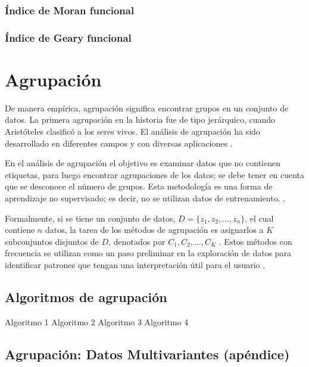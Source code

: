 \documentclass[
]{book}
\begin{document}
\hypertarget{uxedndice-de-moran-funcional}{%
\subsection{Índice de Moran funcional}\label{uxedndice-de-moran-funcional}}

\hypertarget{uxedndice-de-geary-funcional}{%
\subsection{Índice de Geary funcional}\label{uxedndice-de-geary-funcional}}

\hypertarget{agrupaciuxf3n}{%
\chapter{Agrupación}\label{agrupaciuxf3n}}

De manera empírica, agrupación significa encontrar grupos en un conjunto de datos. La primera agrupación en la historia fue de tipo jerárquico, cuando Aristóteles clasificó a los seres vivos. El análisis de agrupación ha sido desarrollado en diferentes campos y con diversas aplicaciones \citep{hand}.

En el análisis de agrupación el objetivo es examinar datos que no contienen etiquetas, para luego encontrar agrupaciones de los datos; se debe tener en cuenta que se desconoce el número de grupos. Esta metodología es una forma de aprendizaje no supervisado; es decir, no se utilizan datos de entrenamiento. \citep{andrew}.

Formalmente, si se tiene un conjunto de datos, \(D=\{z_1,z_2,...,z_n\}\), el cual contiene \(n\) datos, la tarea de los métodos de agrupación es asignarlos a \(K\) subconjuntos disjuntos de \(D\), denotados por \(C_1,C_2,...,C_K\) \citep{hand}. Estos métodos con frecuencia se utilizan como un paso preliminar en la exploración de datos para identificar patrones que tengan una interpretación útil para el usuario \citep{Jaque}.

\hypertarget{algoritmos-de-agrupaciuxf3n}{%
\section{Algoritmos de agrupación}\label{algoritmos-de-agrupaciuxf3n}}

Algoritmo 1 Algoritmo 2 Algoritmo 3 Algoritmo 4

\hypertarget{agrupaciuxf3n-datos-multivariantes-apuxe9ndice}{%
\section{Agrupación: Datos Multivariantes (apéndice)}\label{agrupaciuxf3n-datos-multivariantes-apuxe9ndice}}
\end{document}
